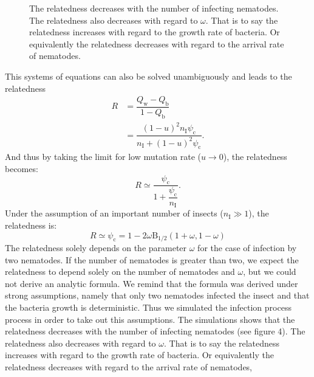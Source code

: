 \documentclass[10pt]{article}
\newcommand{\nI}{{n_\textrm{I}}}
\newcommand{\qw}{Q_\mathrm{w}}
\newcommand{\qb}{Q_\mathrm{b}}
\newcommand{\psic}{\psi_\mathrm{c}}
\begin{document}
\begin{multicols}{2}
\begin{figure}[H]
{The relatedness decreases with the number of infecting nematodes. 
The relatedness also decreases with regard to $\omega$. 
That is to say the relatedness increases with regard to the growth rate of bacteria. 
Or equivalently the relatedness decreases with regard to the arrival rate of nematodes.}
\end{figure}
 This systems of equations can also be solved unambiguously and leads to the relatedness 
 \begin{align}
 R &= \dfrac{\qw - \qb }{1- \qb} \\
   &= \dfrac{(1-u)^2 \nI \psic}{\nI +(1-u)^2 \psic}.
 \end{align}
And thus by taking the limit for low mutation rate ($u \rightarrow 0$), the relatedness becomes:
 \begin{equation}
 R \simeq \dfrac{\psic}{1+ \dfrac{\psic}{\nI}}.
 \end{equation} 
Under the assumption of an important number of insects ($\nI \gg 1$), the relatedness is:
 \begin{equation}
 R \simeq \psic = 1- 2 \omega \mathrm{B}_{1/2}(1+\omega,1-\omega)
 \end{equation}
 The relatedness solely depends on the parameter $\omega$ for the case of infection by two nematodes.
  If the number of nematodes is greater than two, we expect the relatedness to depend solely on the number of nematodes and $\omega$, but we could not derive an analytic formula. 
  We remind that the formula was derived under strong assumptions, namely that only two nematodes infected the insect and that the bacteria growth is deterministic. 
  Thus we simulated the infection process process in order to take out this assumptions. 
  The simulations shows that the relatedness decreases with the number of infecting nematodes (see figure 4). 
  The relatedness also decreases with regard to $\omega$. That is to say the relatedness increases with regard to the growth rate of bacteria. 
  Or equivalently the relatedness decreases with regard to the arrival rate of nematodes, 

\end{multicols}
\end{document}
